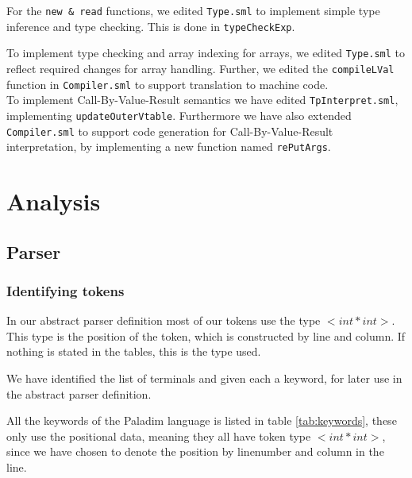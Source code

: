 \documentclass[10pt]{article}
\begin{document}
For the \texttt{new \& read} functions, we edited \texttt{Type.sml} to implement simple type inference and type checking. This is done in \texttt{typeCheckExp}.

To implement type checking and array indexing for arrays, we edited \texttt{Type.sml} to reflect required changes for array handling. Further, we edited the \texttt{compileLVal} function in \texttt{Compiler.sml} to support translation to machine code.\\

To implement Call-By-Value-Result semantics we have edited \texttt{TpInterpret.sml}, implementing \texttt{updateOuterVtable}. Furthermore we have also extended \texttt{Compiler.sml} to support code generation for Call-By-Value-Result interpretation, by implementing a new function named \texttt{rePutArgs}. 

\section{Analysis}
\subsection{Parser}
\subsubsection{Identifying tokens}
In our abstract parser definition most of our tokens use the type $<int*int>$. This type is the position of the token, which is constructed by line and column. If nothing is stated in the tables, this is the type used.

We have identified the list of terminals and given each a keyword, for later use in the abstract parser definition.

All the keywords of the Paladim language is listed in table \ref{tab:keywords}, these only use the positional data, meaning they all have token type $<int*int>$, since we have chosen to denote the position by linenumber and column in the line.
\end{document}
